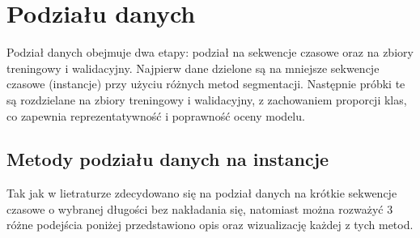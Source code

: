 \documentclass[eeg_v4.tex]{subfiles}
\begin{document}
%
%


    \section{Podziału danych}
    Podział danych obejmuje dwa etapy: podział na sekwencje czasowe oraz na zbiory treningowy i walidacyjny. Najpierw dane dzielone są
    na mniejsze sekwencje czasowe (instancje) przy użyciu różnych metod segmentacji. Następnie próbki te są rozdzielane na
    zbiory treningowy i walidacyjny, z zachowaniem proporcji klas, co zapewnia reprezentatywność i poprawność oceny modelu.

    \subsection{Metody podziału danych na instancje}
    Tak jak w lietraturze \cite{boutarfaia2023,roots2020}
    zdecydowano się na podział danych na krótkie sekwencje czasowe o wybranej długości bez nakładania się, natomiast można rozważyć 3 różne podejścia poniżej
    przedstawiono opis oraz wizualizację każdej z tych metod.
\end{document}
